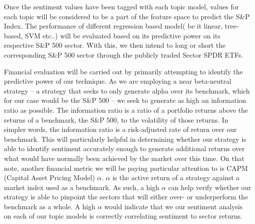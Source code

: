 \documentclass{sig-alternate-05-2015}
\begin{document}
Once the sentiment values have been tagged with each topic model, values for each topic will be considered to be a part of the feature space to predict the S\&P Index. The performance of different regression based model( be it linear, tree-based, SVM etc..)  will be evaluated based on its predictive power on its respective S\&P 500 sector. With this, we then intend to long or short the corresponding S\&P 500 sector through the publicly traded Sector SPDR ETFs.

Financial evaluation will be carried out by primarily attempting to identify the predictive power of our technique. As we are employing a near beta-neutral strategy -- a strategy that seeks to only generate alpha over its benchmark, which for our case would be the S\&P 500 -- we seek to generate as high an information ratio as possible. The information ratio is a ratio of a portfolio returns above the returns of a benchmark, the S\&P 500, to the volatility of those returns. In simpler words, the information ratio is a risk-adjusted rate of return over our benchmark. This will particularly helpful in determining whether our strategy is able to identify sentiment accurately enough to generate additional returns over what would have normally been achieved by the market over this time. On that note, another financial metric we will be paying particular attention to is CAPM (Capital Asset Pricing Model) $\alpha$. $\alpha$ is the active return of a strategy against a market index used as a benchmark. As such, a high $\alpha$ can help verify whether our strategy is able to pinpoint the sectors that will either over- or underperform the benchmark as a whole. A high $\alpha$ would indicate that we our sentiment analysis on each of our topic models is correctly correlating sentiment to sector returns. 

%
%

%
%

%
%




%

%
%
\end{document}
